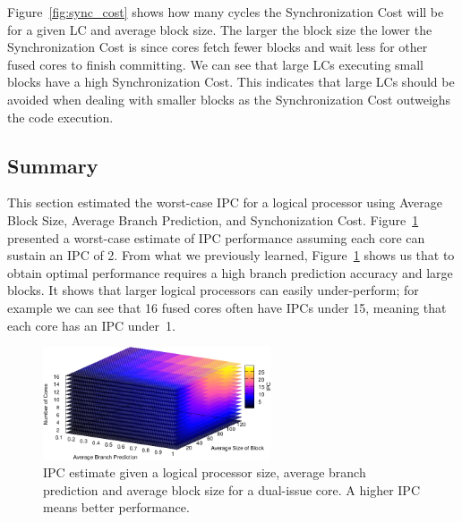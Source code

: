 Figure~\ref{fig:sync_cost} shows how many cycles the Synchronization Cost will be for a given LC and average block size.
The larger the block size the lower the Synchronization Cost is since cores fetch fewer blocks and wait less for other fused cores to finish committing.
We can see that large LCs executing small blocks have a high Synchronization Cost. 
This indicates that large LCs should be avoided when dealing with smaller blocks as the Synchronization Cost outweighs the code execution.

\subsection{Summary}

This section estimated the worst-case IPC for a logical processor using Average Block Size, Average Branch Prediction, and Synchonization Cost.
Figure~\ref{fig:lm_summ} presented a worst-case estimate of IPC performance assuming each core can sustain an IPC of 2.
From what we previously learned, Figure~\ref{fig:lm_summ} shows us that to obtain optimal performance requires a high branch prediction accuracy and large blocks.
It shows that larger logical processors can easily under-perform; for example we can see that 16 fused cores often have IPCs under 15, meaning that each core has an IPC under~1.

\begin{figure}[t]
    \centering
    \includegraphics[width=0.60\textwidth]{graphics/limit_study/summary.pdf}
    \caption{IPC estimate given a logical processor size, average branch prediction and average block size for a dual-issue core. A higher IPC means better performance.}
    \label{fig:lm_summ}
\vspace{5mm}
\end{figure}
